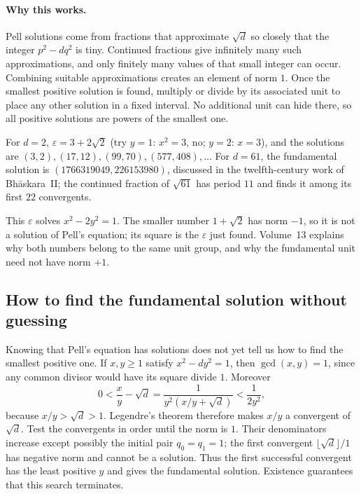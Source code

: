 \paragraph{Why this works.}
Pell solutions come from fractions that approximate $\sqrt d$ so closely that the integer $p^2-dq^2$ is tiny. Continued fractions give infinitely many such approximations, and only finitely many values of that small integer can occur. Combining suitable approximations creates an element of norm $1$. Once the smallest positive solution is found, multiply or divide by its associated unit to place any other solution in a fixed interval. No additional unit can hide there, so all positive solutions are powers of the smallest one.

\begin{example}
For $d=2$, $\varepsilon=3+2\sqrt2$ (try $y=1$: $x^2=3$, no; $y=2$: $x=3$), and the solutions are $(3,2),(17,12),(99,70),(577,408),\dots$ For $d=61$, the fundamental solution is $(1766319049,226153980)$, discussed in the twelfth-century work of Bh\=askara~II; the continued fraction of $\sqrt{61}$ has period $11$ and finds it among its first $22$ convergents.
\end{example}

This $\varepsilon$ solves $x^2-2y^2=1$. The smaller number $1+\sqrt2$ has norm $-1$, so it is not a solution of Pell's equation; its square is the $\varepsilon$ just found. Volume~13 explains why both numbers belong to the same unit group, and why the fundamental unit need not have norm $+1$.

\subsection*{How to find the fundamental solution without guessing}
Knowing that Pell's equation has solutions does not yet tell us how to find the smallest positive one. If $x,y\ge1$ satisfy $x^2-dy^2=1$, then $\gcd(x,y)=1$, since any common divisor would have its square divide $1$. Moreover
\[
0<\frac xy-\sqrt d
=\frac{1}{y^2(x/y+\sqrt d)}
<\frac{1}{2y^2},
\]
because $x/y>\sqrt d>1$. Legendre's theorem therefore makes $x/y$ a convergent of $\sqrt d$. Test the convergents in order until the norm is $1$. Their denominators increase except possibly the initial pair $q_0=q_1=1$; the first convergent $\lfloor\sqrt d\rfloor/1$ has negative norm and cannot be a solution. Thus the first successful convergent has the least positive $y$ and gives the fundamental solution. Existence guarantees that this search terminates.

